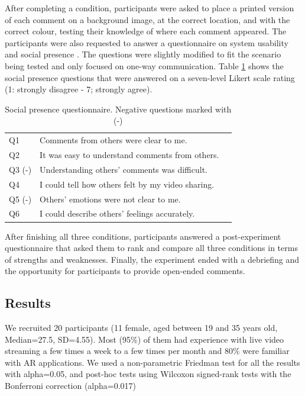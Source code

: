 After completing a condition, participants were asked to place a printed version of each comment on a background image, at the correct location, and with the correct colour, testing their knowledge of where each comment appeared. The participants were also requested to answer a questionnaire on system usability \cite{brooke1996sus} and social presence \cite{Harms2004}. The questions were slightly modified to fit the scenario being tested and only focused on one-way communication. Table \ref{table:social_questions} shows the social presence questions that were answered on a seven-level Likert scale rating (1: strongly disagree - 7; strongly agree). 

\begin{table}[h]
  \centering
  \caption{Social presence questionnaire. Negative questions marked with (-)}
  \label{table:social_questions}
  \begin{tabular}{lll}
    Q1 & Comments from others were clear to me.          \\
    Q2 & It was easy to understand comments from others. \\
    Q3 (-) & Understanding others' comments was difficult.  \\
    Q4 & I could tell how others felt by my video sharing.\\
    Q5 (-) & Others' emotions were not clear to me.\\
    Q6 & I could describe others' feelings accurately.
  \end{tabular}
\end{table}


After finishing all three conditions, participants answered a post-experiment questionnaire that asked them to rank and compare all three conditions in terms of strengths and weaknesses. Finally, the experiment ended with a debriefing and the opportunity for participants to provide open-ended comments.

\subsection{Results}

We recruited 20 participants (11 female, aged between 19 and 35 years old, Median=27.5, SD=4.55). Most (95\%) of them had experience with live video streaming a few times a week to a few times per month and 80\% were familiar with AR applications. We used a non-parametric Friedman test for all the results with alpha=0.05, and post-hoc tests using Wilcoxon signed-rank tests with the Bonferroni correction (alpha=0.017)

